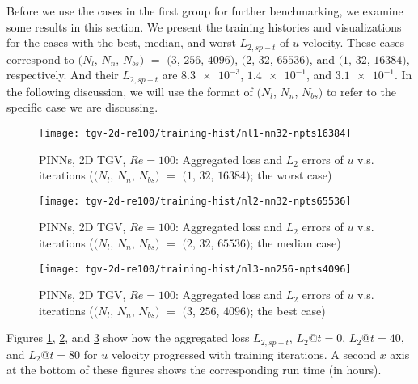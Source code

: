 
Before we use the cases in the first group for further benchmarking, we examine some results in this section.
We present the training histories and visualizations for the cases with the best, median, and worst $L_{2,sp-t}$ of $u$ velocity.
These cases correspond to $(N_l$, $N_n$, $N_{bs})$ $=$ $(3$, $256$, $4096)$, $(2$, $32$, $65536)$, and $(1$, $32$, $16384)$, respectively.
And their $L_{2,sp-t}$ are $\num{8.3e-3}$, $\num{1.4e-1}$, and $\num{3.1e-1}$.
In the following discussion, we will use the format of $(N_l$, $N_n$, $N_{bs})$ to refer to the specific case we are discussing.

\begin{figure}[hbt!]
\centering%
\texttt{[image: tgv-2d-re100/training-hist/nl1-nn32-npts16384]}%
\caption[%
    PINNs, 2D TGV, $Re=100$: Aggregated loss and $L_2$ errors of $u$ v.s. iterations ($(N_l$, $N_n$, $N_{bs})$ $=$ $(1$, $32$, $16384)$; the worst case)%
]{%
    PINNs, 2D TGV, $Re=100$: Aggregated loss and $L_2$ errors of $u$ v.s. iterations ($(N_l$, $N_n$, $N_{bs})$ $=$ $(1$, $32$, $16384)$; the worst case)%
}\label{fig:nl1-nn32-npts16384-loss-err-hist}%
\end{figure}

\begin{figure}[hbt!]
\centering%
\texttt{[image: tgv-2d-re100/training-hist/nl2-nn32-npts65536]}%
\caption[%
    PINNs, 2D TGV, $Re=100$: Aggregated loss and $L_2$ errors of $u$ v.s. iterations ($(N_l$, $N_n$, $N_{bs})$ $=$ $(2$, $32$, $65536)$; the median case)%
]{%
    PINNs, 2D TGV, $Re=100$: Aggregated loss and $L_2$ errors of $u$ v.s. iterations ($(N_l$, $N_n$, $N_{bs})$ $=$ $(2$, $32$, $65536)$; the median case)%
}\label{fig:nl2-nn32-npts65536-loss-err-hist}%
\end{figure}

\begin{figure}[hbt!]
\centering%
\texttt{[image: tgv-2d-re100/training-hist/nl3-nn256-npts4096]}%
\caption[%
    PINNs, 2D TGV, $Re=100$: Aggregated loss and $L_2$ errors of $u$ v.s. iterations ($(N_l$, $N_n$, $N_{bs})$ $=$ $(3$, $256$, $4096)$; the best case)%
]{%
    PINNs, 2D TGV, $Re=100$: Aggregated loss and $L_2$ errors of $u$ v.s. iterations ($(N_l$, $N_n$, $N_{bs})$ $=$ $(3$, $256$, $4096)$; the best case)%
}\label{fig:nl3-nn256-npts4096-loss-err-hist}%
\end{figure}

Figures \ref{fig:nl1-nn32-npts16384-loss-err-hist}, \ref{fig:nl2-nn32-npts65536-loss-err-hist}, and \ref{fig:nl3-nn256-npts4096-loss-err-hist} show how the aggregated loss $L_{2,sp-t}$, $L_2@t=0$, $L_2@t=40$, and $L_2@t=80$ for $u$ velocity progressed with training iterations.
A second $x$ axis at the bottom of these figures shows the corresponding run time (in hours).

